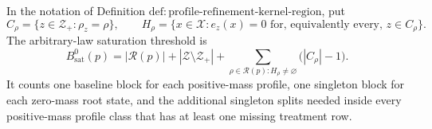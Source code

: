 In the notation of
Definition \(\mathrm{def:profile\text{-}refinement\text{-}kernel\text{-}region}\),
put
\[
 C_\rho=\{z\in\mathcal Z_+:\rho_z=\rho\},
 \qquad
 H_\rho=\{x\in\mathcal X:e_z(x)=0\text{ for, equivalently every, }
 z\in C_\rho\}.
\]
The arbitrary-law saturation threshold is
\[
 B_{\mathrm{sat}}^0(p)
 =|\mathcal R(p)|+|\mathcal Z\setminus\mathcal Z_+|
 +\sum_{\rho\in\mathcal R(p):H_\rho\ne\varnothing}
 \bigl(|C_\rho|-1\bigr).
\]
It counts one baseline block for each positive-mass profile, one singleton
block for each zero-mass root state, and the additional singleton splits
needed inside every positive-mass profile class that has at least one
missing treatment row.